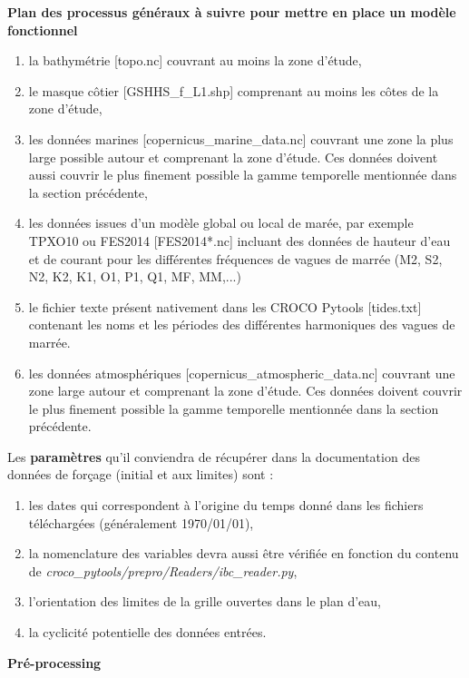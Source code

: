 \documentclass[10pt,a4paper,titlepage]{article}
\begin{document}
\begin{processEnv}{\textbf{Plan des processus généraux à suivre pour mettre en place un modèle fonctionnel}}
    \begin{enumerate}
        \item la bathymétrie {\color{darkgrey}[topo.nc]} couvrant au moins la zone d'étude,
        \item le masque côtier {\color{darkgrey}[GSHHS\_f\_L1.shp]} comprenant au moins les côtes de la zone d'étude,
        \item les données marines {\color{darkgrey}[copernicus\_marine\_data.nc]} couvrant une zone la plus large possible autour et comprenant la zone d'étude. Ces données doivent aussi couvrir le plus finement possible la gamme temporelle mentionnée dans la section précédente,
        \item les données issues d'un modèle global ou local de marée, par exemple TPXO10 ou FES2014 {\color{darkgrey}[FES2014*.nc]} incluant des données de hauteur d'eau et de courant pour les différentes fréquences de vagues de marrée (M2, S2, N2, K2, K1, O1, P1, Q1, MF, MM,...)
        \item le fichier texte présent nativement dans les CROCO Pytools {\color{darkgrey}[tides.txt]} contenant les noms et les périodes des différentes harmoniques des vagues de marrée.
        \item les données atmosphériques {\color{darkgrey}[copernicus\_atmospheric\_data.nc]} couvrant une zone large autour et comprenant la zone d'étude. Ces données doivent couvrir le plus finement possible la gamme temporelle mentionnée dans la section précédente.
    \end{enumerate}

    Les {\color{paramColor}\textbf{paramètres}} qu'il conviendra de récupérer dans la documentation des données de forçage (initial et aux limites) sont :

    \begin{enumerate}
        \item les dates qui correspondent à l'origine du temps donné dans les fichiers téléchargées (généralement 1970/01/01),
        \item la nomenclature des variables devra aussi être vérifiée en fonction du contenu de \textit{croco\_pytools/prepro/Readers/ibc\_reader.py},
        \item l'orientation des limites de la grille ouvertes dans le plan d'eau,
        \item la cyclicité potentielle des données entrées.
    \end{enumerate}

    {\color{workColor}\textbf{Pré-processing}}


\end{processEnv}
\end{document}
